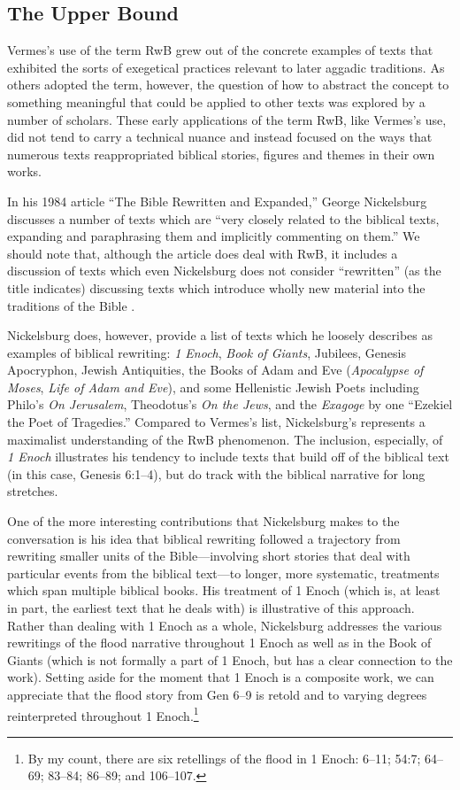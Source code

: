 \subsection{The Upper Bound}\label{the-upper-bound}

Vermes's use of the term RwB grew out of the concrete examples of texts
that exhibited the sorts of exegetical practices relevant to later
aggadic traditions. As others adopted the term, however, the question of
how to abstract the concept to something meaningful that could be
applied to other texts was explored by a number of scholars. These early
applications of the term RwB, like Vermes's use, did not tend to carry a
technical nuance and instead focused on the ways that numerous texts
reappropriated biblical stories, figures and themes in their own works.

In his 1984 article ``The Bible Rewritten and Expanded,'' George
Nickelsburg discusses a number of texts which are ``very closely related
to the biblical texts, expanding and paraphrasing them and implicitly
commenting on them.''\autocite[89]{nickelsburg_stone1984} We should note
that, although the article does deal with RwB, it includes a discussion
of texts which even Nickelsburg does not consider ``rewritten'' (as the
title indicates) discussing texts which introduce wholly new material
into the traditions of the Bible
\autocite[89--90]{nickelsburg_stone1984}.

Nickelsburg does, however, provide a list of texts which he loosely
describes as examples of biblical rewriting: \emph{1 Enoch}, \emph{Book
of Giants}, Jubilees, Genesis Apocryphon, Jewish Antiquities, the Books
of Adam and Eve (\emph{Apocalypse of Moses}, \emph{Life of Adam and
Eve}), and some Hellenistic Jewish Poets including Philo's \emph{On
Jerusalem}, Theodotus's \emph{On the Jews}, and the \emph{Exagoge} by
one ``Ezekiel the Poet of Tragedies.'' Compared to Vermes's list,
Nickelsburg's represents a maximalist understanding of the RwB
phenomenon. The inclusion, especially, of \emph{1 Enoch} illustrates his
tendency to include texts that build off of the biblical text (in this
case, Genesis 6:1--4), but do track with the biblical narrative for long
stretches.

One of the more interesting contributions that Nickelsburg makes to the
conversation is his idea that biblical rewriting followed a trajectory
from rewriting smaller units of the Bible---involving short stories that
deal with particular events from the biblical text---to longer, more
systematic, treatments which span multiple biblical books. His treatment
of 1 Enoch (which is, at least in part, the earliest text that he deals
with) is illustrative of this approach. Rather than dealing with 1 Enoch
as a whole, Nickelsburg addresses the various rewritings of the flood
narrative throughout 1 Enoch as well as in the Book of Giants (which is
not formally a part of 1 Enoch, but has a clear connection to the work).
Setting aside for the moment that 1 Enoch is a composite work, we can
appreciate that the flood story from Gen 6--9 is retold and to varying
degrees reinterpreted throughout 1 Enoch.\footnote{By my count, there
  are six retellings of the flood in 1 Enoch: 6--11; 54:7; 64--69;
  83--84; 86--89; and 106--107.}

